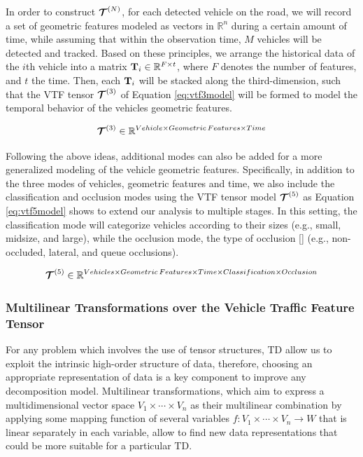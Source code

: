 \documentclass[sensors,article,submit,moreauthors,pdftex]{Definitions/mdpi}
\newcommand{\mathmat}[1]{\boldsymbol{\mathbf{\MakeUppercase{#1}}}}
\newcommand{\mathten}[1]{\boldsymbol{\mathbf{\mathcal{\MakeUppercase{#1}}}}}
\begin{document}
In order to construct $\mathten{T}^{(N)}$, for each detected vehicle on the road, we will record a set of geometric features modeled as vectors in $\mathbb{R}^n$ during a certain amount of time, while assuming that within the observation time, $M$ vehicles will be detected and tracked. Based on these principles, we arrange the historical data of the $i$th vehicle into a matrix $\mathmat{T}_i \in \mathbb{R}^{F \times t}$, where $F$ denotes the number of features, and $t$ the time. Then, each $\mathmat{T}_i$ will be stacked along the third-dimension, such that the VTF tensor $\mathten{T}^{(3)}$ of Equation \ref{eq:vtf3model} will be formed to model the temporal behavior of the vehicles geometric features.

\begin{equation}
\mathten{T}^{(3)} \in \mathbb{R}^{Vehicle \times Geometric\,Features \times Time}
\label{eq:vtf3model}
\end{equation}

Following the above ideas, additional modes can also be added for a more generalized modeling of the vehicle geometric features. Specifically, in addition to the three modes of vehicles, geometric features and time, we also include the classification and occlusion modes using the VTF tensor model $\mathten{T}^{(5)}$ as Equation \ref{eq:vtf5model} shows to extend our analysis to multiple stages. In this setting, the classification mode will categorize vehicles according to their sizes (e.g., small, midsize, and large), while the occlusion mode, the type of occlusion [] (e.g., non-occluded, lateral, and queue occlusions).

\begin{equation}
\mathten{T}^{(5)} \in \mathbb{R}^{Vehicles \times Geometric\,Features \times Time \times Classification \times Occlusion}
\label{eq:vtf5model}
\end{equation}

\subsubsection{Multilinear Transformations over the Vehicle Traffic Feature Tensor}
For any problem which involves the use of tensor structures, TD allow us to  exploit the intrinsic high-order structure of data, therefore, choosing an appropriate representation of data is a key component to improve any decomposition model. Multilinear transformations, which aim to express a multidimensional vector space $V_1 \times \cdots \times V_n$ as their multilinear combination by applying some mapping function of several variables $f : V_1 \times \cdots \times V_n \rightarrow W$ that is linear separately in each variable, allow to find new data representations that could be more suitable for a particular TD.
\end{document}
